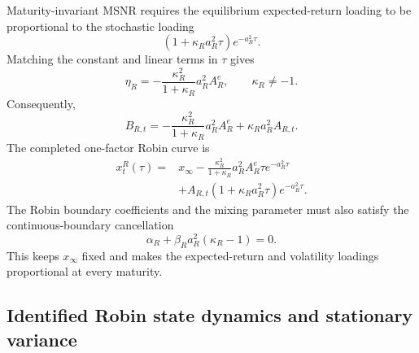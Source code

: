 \documentclass[12pt]{article}
\numberwithin{equation}{subsection}
\begin{document}
Maturity-invariant MSNR requires the equilibrium expected-return loading to be proportional to the stochastic loading
\begin{equation}
\left(1+\kappa_Ra_R^2\tau\right)e^{-a_R^2\tau}.
\end{equation}
Matching the constant and linear terms in $\tau$ gives
\begin{equation}
\eta_R
=
-\frac{\kappa_R^2}{1+\kappa_R}a_R^2A_R^e,
\qquad \kappa_R\ne-1.
\end{equation}
Consequently,
\begin{equation}
B_{R,t}
=
-\frac{\kappa_R^2}{1+\kappa_R}a_R^2A_R^e
+
\kappa_Ra_R^2A_{R,t}.
\end{equation}
The completed one-factor Robin curve is
\begin{equation}
\begin{aligned}
x^R_t(\tau)
={}&x_\infty
-\frac{\kappa_R^2}{1+\kappa_R}a_R^2A_R^e\tau e^{-a_R^2\tau}
\\
&+A_{R,t}\left(1+\kappa_Ra_R^2\tau\right)e^{-a_R^2\tau}.
\end{aligned}
\end{equation}
The Robin boundary coefficients and the mixing parameter must also satisfy the continuous-boundary cancellation
\begin{equation}
\alpha_R+\beta_Ra_R^2(\kappa_R-1)=0.
\end{equation}
This keeps $x_\infty$ fixed and makes the expected-return and volatility loadings proportional at every maturity.

\subsection{Identified Robin state dynamics and stationary variance}
\end{document}
